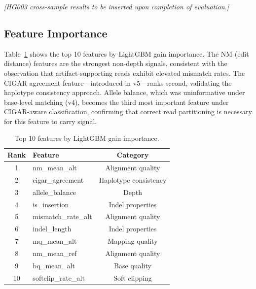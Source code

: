 \documentclass[sigconf]{acmart}
\begin{document}

\textit{[HG003 cross-sample results to be inserted upon completion of evaluation.]}

\subsection{Feature Importance}
Table~\ref{tab:importance} shows the top 10 features by LightGBM gain importance. The NM (edit distance) features are the strongest non-depth signals, consistent with the observation that artifact-supporting reads exhibit elevated mismatch rates. The CIGAR agreement feature---introduced in v5---ranks second, validating the haplotype consistency approach. Allele balance, which was uninformative under base-level matching (v4), becomes the third most important feature under CIGAR-aware classification, confirming that correct read partitioning is necessary for this feature to carry signal.

\begin{table}[h]
\caption{Top 10 features by LightGBM gain importance.}
\label{tab:importance}
\begin{tabular}{clc}
\toprule
\textbf{Rank} & \textbf{Feature} & \textbf{Category} \\
\midrule
1 & nm\_mean\_alt & Alignment quality \\
2 & cigar\_agreement & Haplotype consistency \\
3 & allele\_balance & Depth \\
4 & is\_insertion & Indel properties \\
5 & mismatch\_rate\_alt & Alignment quality \\
6 & indel\_length & Indel properties \\
7 & mq\_mean\_alt & Mapping quality \\
8 & nm\_mean\_ref & Alignment quality \\
9 & bq\_mean\_alt & Base quality \\
10 & softclip\_rate\_alt & Soft clipping \\
\bottomrule
\end{tabular}
\end{table}
\end{document}
